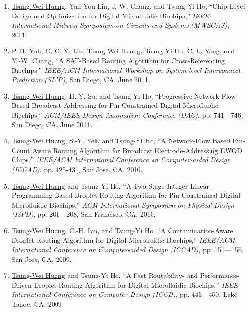 \documentclass[A4,11pt]{article}
\begin{document}
\begin{enumerate}
    \item \underline{Tsung-Wei Huang}, Yan-You Lin, J.-W. Chang, and Tsung-Yi Ho, ``Chip-Level Design and Optimization for Digital Microfluidic Biochips,'' \textit{IEEE International Midwest Symposium on Circuits and Systems (MWSCAS)}, 2011. 
    \item P.-H. Yuh, C. C.-Y. Lin, \underline{Tsung-Wei Huang}, Tsung-Yi Ho, C.-L. Yang, and Y.-W. Chang, ``A SAT-Based Routing Algorithm for Cross-Referencing Biochips,'' \textit{IEEE/ACM International Workshop on System-level Interconnect Prediction (SLIP)}, San Diego, CA, June 2011.
    \item \underline{Tsung-Wei Huang}, H.-Y. Su, and Tsung-Yi Ho, ``Progressive Network-Flow Based Broadcast Addressing for Pin-Constrained Digital Microfluidic Biochips,'' \textit{ACM/IEEE Design Automation Conference (DAC)}, pp. 741—746, San Diego, CA, June 2011. 
    \item \underline{Tsung-Wei Huang}, S.-Y. Yeh, and Tsung-Yi Ho, ``A Network-Flow Based Pin-Count Aware Routing Algorithm for Broadcast Electrode-Addressing EWOD Chips,'' \textit{IEEE/ACM International Conference on Computer-aided Design (ICCAD)}, pp. 425-431, San Jose, CA, 2010. 
    \item \underline{Tsung-Wei Huang} and Tsung-Yi Ho, ``A Two-Stage Integer-Linear-Programming Based Droplet Routing Algorithm for Pin-Constrained Digital Microfluidic Biochips,'' \textit{ACM International Symposium on Physical Design (ISPD)}, pp. 201—208, San Francisco, CA, 2010. 
    \item \underline{Tsung-Wei Huang}, C.-H. Lin, and Tsung-Yi Ho, ``A Contamination-Aware Droplet Routing Algorithm for Digital Microfluidic Biochips,'' \textit{IEEE/ACM International Conference on Computer-aided Design (ICCAD)}, pp. 151—156, San Jose, CA, 2009. 
    \item \underline{Tsung-Wei Huang} and Tsung-Yi Ho, ``A Fast Routability- and Performance-Driven Droplet Routing Algorithm for Digital Microfluidic Biochips,'' \textit{IEEE International Conference on Computer Design (ICCD)}, pp. 445—450, Lake Tahoe, CA, 2009

 \end{enumerate}
\end{document}
